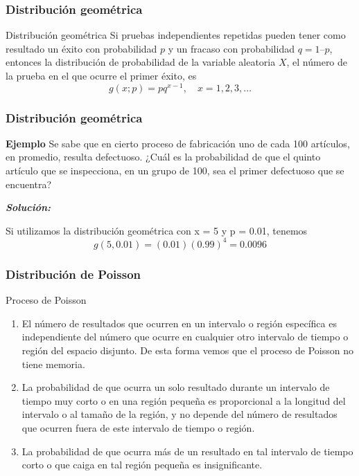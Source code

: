 \documentclass[spanish]{beamer}
\begin{document}
\begin{frame}
\frametitle{Distribución geométrica}  

\begin{block}{Distribución geométrica}
Si pruebas independientes repetidas pueden tener como resultado un éxito con probabilidad $p$ y un fracaso con probabilidad $q = 1 – p$, entonces la distribución de probabilidad de la variable aleatoria $X$, el número de la prueba en el que ocurre el primer éxito, es
\begin{equation*}
g(x;p)=pq^{x-1},  \quad x=1,2,3,\ldots
\end{equation*}
\end{block}

\end{frame}
\begin{frame}
\frametitle{Distribución geométrica}  

\textbf{Ejemplo }
Se sabe que en cierto proceso de fabricación uno de cada 100 artículos, en promedio,
resulta defectuoso. ¿Cuál es la probabilidad de que el quinto artículo que se inspecciona,
en un grupo de 100, sea el primer defectuoso que se encuentra?

\textit{\textbf{Solución:}}

Si utilizamos la distribución geométrica con x = 5 y p = 0.01, tenemos
\begin{equation*}
g(5,0.01)=(0.01)(0.99)^4=0.0096
\end{equation*}
\end{frame}

\begin{frame}
\frametitle{Distribución de Poisson}  
Proceso de Poisson
\begin{enumerate}
\item El número de resultados que ocurren en un intervalo o región específica es independiente del número que ocurre en cualquier otro intervalo de tiempo o región del
espacio disjunto. De esta forma vemos que el proceso de Poisson no tiene memoria.
\item La probabilidad de que ocurra un solo resultado durante un intervalo de tiempo
muy corto o en una región pequeña es proporcional a la longitud del intervalo o al
tamaño de la región, y no depende del número de resultados que ocurren fuera de
este intervalo de tiempo o región.
\item La probabilidad de que ocurra más de un resultado en tal intervalo de tiempo corto
o que caiga en tal región pequeña es insignificante.
\end{enumerate}
\end{frame}
\end{document}
